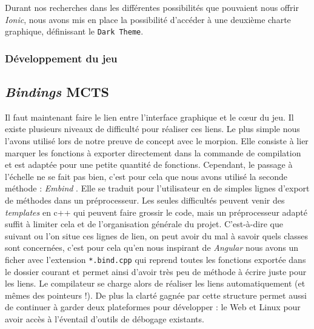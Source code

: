 \documentclass[a4paper,11pt]{article}
\begin{document}
Durant nos recherches dans les différentes possibilités que pouvaient
nous offrir \emph{Ionic}, nous avons mis en place la possibilité
d'accéder à une deuxième charte graphique, définissant le
\texttt{Dark\ Theme}.

\hypertarget{duxe9veloppement-du-jeu}{%
\subsubsection{Développement du jeu}\label{duxe9veloppement-du-jeu}}

\hypertarget{bindings-mcts}{%
\subsection{\texorpdfstring{\emph{Bindings}
MCTS}{Bindings MCTS}}\label{bindings-mcts}}

Il faut maintenant faire le lien entre l'interface graphique et le cœur
du jeu. Il existe plusieurs niveaux de difficulté pour réaliser ces
liens. Le plus simple nous l'avons utilisé lors de notre preuve de
concept avec le morpion. Elle consiste à lier marquer les fonctions à
exporter directement dans la commande de compilation et est adaptée pour
une petite quantité de fonctions. Cependant, le passage à l'échelle ne
se fait pas bien, c'est pour cela que nous avons utilisé la seconde
méthode : \emph{Embind} \citep{embind}. Elle se traduit pour
l'utilisateur en de simples lignes d'export de méthodes dans un
préprocesseur. Les seules difficultés peuvent venir des \emph{templates}
en c++ qui peuvent faire grossir le code, mais un préprocesseur adapté
suffit à limiter cela et de l'organisation générale du projet.
C'est-à-dire que suivant ou l'on situe ces lignes de lien, on peut avoir
du mal à savoir quels classes sont concernées, c'est pour cela qu'en
nous inspirant de \emph{Angular} nous avons un ficher avec l'extension
\texttt{*.bind.cpp} qui reprend toutes les fonctions exportée dans le
dossier courant et permet ainsi d'avoir très peu de méthode à écrire
juste pour les liens. Le compilateur se charge alors de réaliser les
liens automatiquement (et mêmes des pointeurs !). De plus la clarté
gagnée par cette structure permet aussi de continuer à garder deux
plateformes pour développer : le Web et Linux pour avoir accès à
l'éventail d'outils de débogage existants.
\end{document}
